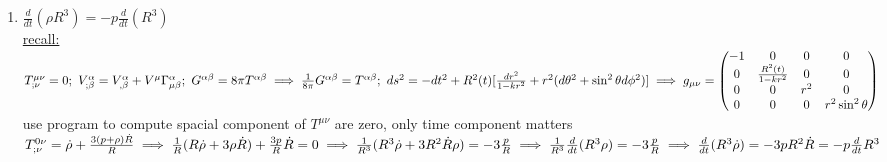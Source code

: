 \documentclass[12pt]{amsart}
\begin{document}
\begin{enumerate}
\item \underline{$\frac{d}{dt} ( \rho R^3) = - p \frac{d}{dt} (R^3)$}\\
\underline{recall:} $T^{\mu \nu}_{; \nu} = 0;\,\, V_{; \beta}^{\alpha} = V_{, \beta}^{\alpha} + V^{\mu} \Gamma_{\mu \beta}^{\alpha};\,\, G^{\alpha \beta} = 8 \pi T^{\alpha \beta} \implies \frac{1}{8 \pi} G^{\alpha \beta} = T^{\alpha \beta};\,\, ds^2 = - dt^2 + R^2(t) [ \frac{dr^2}{1-k r^2} + r^2 ( d \theta^2 + \sin^2 \theta d \phi^2)]\\
\implies g_{\mu \nu} = \begin{pmatrix} -1 & 0 & 0 & 0 \\ 0 & \frac{R^2(t)}{1-kr^2} & 0 & 0\\
0 & 0 & r^2 & 0 \\
0 & 0 & 0 & r^2 \sin^2 \theta \end{pmatrix}\\$
use program to compute spacial component of $T^{\mu \nu}$ are zero, only time component matters\\
$T^{0 \nu}_{; \nu} = \dot{\rho} + \frac{3 ( p+ \rho) \dot{R}}{R}\\
\implies \frac{1}{R}( R \dot{\rho} + 3 \rho \dot{R}) + \frac{3 p}{R} \dot{R} = 0\\
\implies \frac{1}{R^3} ( R^3 \dot{\rho} + 3 R^2 \dot{R} \rho) = - 3 \frac{p}{R}\\
\implies \frac{1}{R^3} \frac{d}{dt} ( R^3 \rho) = - 3 \frac{p}{R}\\
\implies \frac{d}{dt} (R^3 \dot{\rho}) = - 3 p R^2 \dot{R} = - p \frac{d}{dt} R^3\\$

















\end{enumerate}
\end{document}
